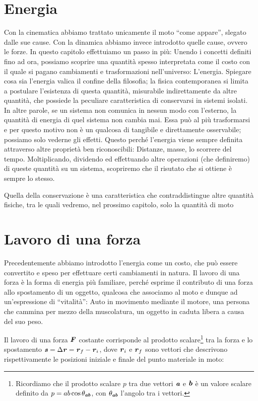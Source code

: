 \marginpar{\minitoc}

\section{Energia}
Con la cinematica abbiamo trattato unicamente il moto ``come appare'', slegato
dalle sue cause. Con la dinamica abbiamo invece introdotto quelle cause, ovvero le
forze. In questo capitolo effettuiamo un passo in più: Unendo
i concetti definiti fino ad ora, possiamo scoprire una quantità spesso
interpretata come il costo con il quale si pagano cambiamenti e trasformazioni
nell'universo: L'energia. Spiegare cosa sia l'energia valica il confine della
filosofia; la fisica contemporanea si limita a postulare l'esistenza di questa
quantità, misurabile indirettamente da altre quantità, che possiede la peculiare
caratteristica di conservarsi in sistemi isolati. In altre parole, se un
sistema non comunica in nessun modo con l'esterno, la quantità di energia di
quel sistema non cambia mai. Essa può al più trasformarsi e per questo
motivo non è un qualcosa di tangibile e direttamente osservabile; possiamo solo
vederne gli effetti. Questo perché l'energia viene sempre
definita attraverso altre proprietà ben riconoscibili: Distanze,
masse, lo scorrere del tempo. Moltiplicando, dividendo ed effettuando altre
operazioni (che definiremo) di queste quantità su un sistema, scopriremo che
il risutato che si ottiene è sempre lo stesso.

Quella della conservazione è una caratteristica che contraddistingue altre
quantità fisiche, tra le quali vedremo, nel prossimo capitolo, solo la quantità di moto


\section{Lavoro di una forza}
Precedentemente abbiamo introdotto
l'energia come un costo, che può essere convertito e speso per effettuare certi
cambiamenti in natura. Il lavoro di una forza è la forma di energia più familiare,
perché esprime il contributo di una forza allo spostamento di un oggetto, qualcosa
che associamo al moto e dunque ad un'espressione di ``vitalità'': Auto in movimento
mediante il motore,
una persona che cammina per mezzo della muscolatura, un oggetto in caduta libera a
causa del suo peso.

Il lavoro di una forza $\textbf{\textit{F}}$ costante corrisponde al prodotto scalare\footnote{Ricordiamo
che il prodotto scalare $p$ tra due vettori $\textbf{\textit{a}}$ e $\textbf{\textit{b}}$ è un valore scalare
definito da $p = ab\cos\theta_{\textbf{\textit{ab}}}$, con $\theta_{\textbf{\textit{ab}}}$
l'angolo tra i vettori.}
tra la forza e lo spostamento $\textbf{\textit{s}} = \Delta\textbf{\textit{r}} = \textbf{\textit{r}}_f - \textbf{\textit{r}}_i$,
dove $\textbf{\textit{r}}_i$ e $\textbf{\textit{r}}_f$ sono vettori che descrivono rispettivamente
le posizioni iniziale e finale del punto materiale in moto:

